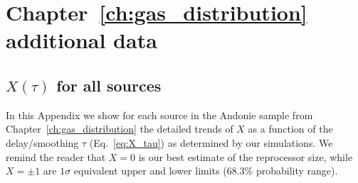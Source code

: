 
\chapter{Chapter~\ref{ch:gas_distribution} additional data}


\section{$X(\tau)$ for all sources} \label{appendix_lightcurves}
In this Appendix we show for each source in the Andonie sample from Chapter~\ref{ch:gas_distribution} the detailed trends of $X$ as a function of the delay/smoothing $\tau$ (Eq.~\ref{eq:X_tau}) as determined by our simulations. We remind the reader that $X=0$ is our best estimate of the reprocessor size, while $X=\pm 1$ are $1\sigma$ equivalent upper and lower limits (68.3\% probability range).

